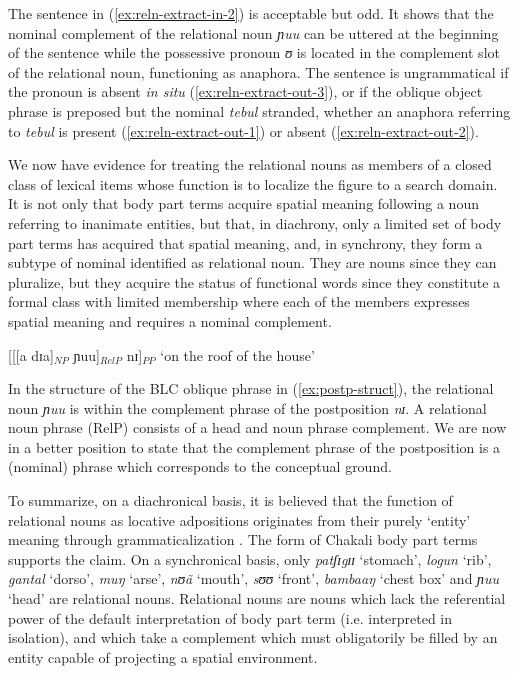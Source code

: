 \begin{exe}
\begin{exe}
\begin{exe}
{\begin{exe}
\begin{exe}
\begin{exe}
\begin{exe}
\begin{exe}
\begin{exe}
\begin{exe}
\begin{xlist}
The sentence in  (\ref{ex:reln-extract-in-2}) is acceptable but odd. It shows
that the nominal complement of the relational noun
{\it ɲuu} can be uttered at the beginning of the sentence while the possessive
pronoun {\it ʊ}  is located  in the complement slot of   the relational noun, 
functioning as anaphora. The sentence is ungrammatical if the
pronoun is absent {\it in situ} (\ref{ex:reln-extract-out-3}),  or if the
oblique object phrase is preposed but the nominal {\it tebul} stranded, whether
an anaphora referring to {\it tebul} is present  (\ref{ex:reln-extract-out-1}) 
or absent
(\ref{ex:reln-extract-out-2}). 



We now have  evidence for treating the relational nouns as
members of a closed class of lexical items whose function is to localize the
figure to a
search domain.  It is not only that body part terms acquire spatial meaning
following a noun referring to inanimate entities, but that, in diachrony, 
only a limited set of body part
terms has acquired that spatial meaning,  and, in synchrony, 
they form a subtype of nominal identified as relational noun. They are 
nouns since they can pluralize, but they acquire the status of functional words
since they constitute a formal class with limited membership where each of
the members expresses spatial meaning and requires a nominal complement.

\ea\label{ex:postp-struct}
 [[[a dɪa]$_{NP}$ ɲuu]$_{RelP}$ nɪ]$_{PP}$   `on the roof of the house' 
\z

In the structure  of the BLC oblique  phrase  in (\ref{ex:postp-struct}), the 
relational noun {\it ɲuu} is within the complement phrase of the postposition 
{\it 
nɪ}.  A relational noun phrase (RelP) consists of a head  and noun phrase 
complement.  We are now in a  better position to state that the complement 
phrase of the postposition is a (nominal) phrase which corresponds to the 
conceptual ground. 


To summarize, on a diachronical basis, it is believed that the function of 
relational nouns  as locative adpositions originates from their purely `entity'
meaning
through grammaticalization \cite[44, 83]{Hein84}. The form of Chakali body part
terms supports the claim.   On a synchronical basis, only  {\it patʃɪgɪɪ}
`stomach',  {\it logun } `rib',  {\it gantal} `dorso', {\it muŋ}   `arse', {\it 
nʊã} `mouth',  {\it sʊʊ} `front', {\it bambaaŋ} `chest box'  and {\it ɲuu} 
`head'
are relational nouns. Relational nouns are  nouns which lack the 
referential power of the default interpretation of  body part term  (i.e.
interpreted in  isolation), and which take a
complement which must obligatorily be filled by an entity capable of projecting
a spatial environment.


\end{xlist}
\end{exe}
\end{exe}
\end{exe}
\end{exe}
\end{exe}
\end{exe}
\end{exe}}
\end{exe}
\end{exe}
\end{exe}
